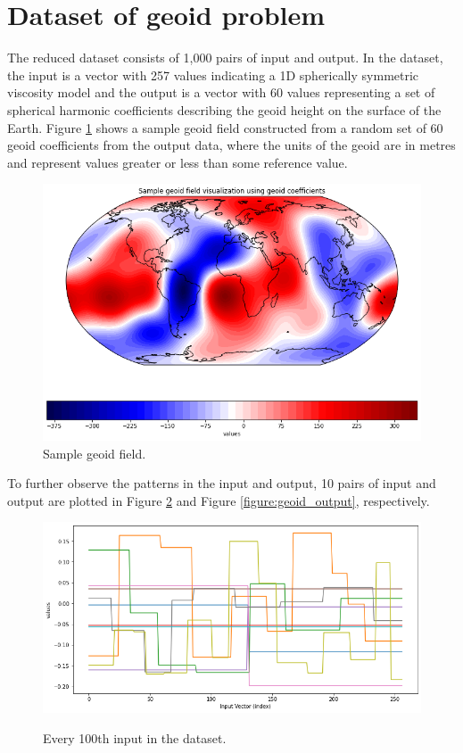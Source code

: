 \section{Dataset of geoid problem}

The reduced dataset consists of 1,000 pairs of input and output. In the dataset, the input is a vector with 257 values indicating a 1D spherically symmetric viscosity model and the output is a vector with 60 values representing a set of spherical harmonic coefficients describing the geoid height on the surface of the Earth. Figure \ref{figure:geoid_sample} shows a sample geoid field constructed from a random set of 60 geoid coefficients from the output data, where the units of the geoid are in metres and represent values greater or less than some reference value.

\begin{figure}[H]
    \caption{Sample geoid field.}
    \label{figure:geoid_sample}
    \includegraphics[scale=0.6]{figures/geoid_images/Geoid_Sample_visualization.png}
\end{figure}

To further observe the patterns in the input and output, 10 pairs of input and output are plotted in Figure \ref{figure:geoid_input} and Figure \ref{figure:geoid_output}, respectively.

\begin{figure}[H]
    \centering
    \caption{Every 100th input in the dataset.}
    \includegraphics[scale=0.5]{figures/geoid_images/Geoid_sample_input.png}
    \label{figure:geoid_input}
\end{figure}

